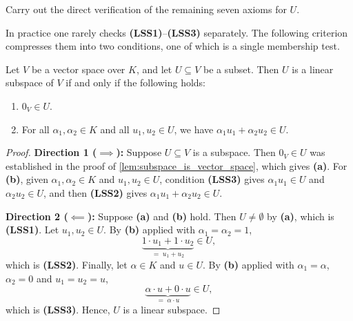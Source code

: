 \begin{exercise}
\label{exc:subspace_axioms}
Carry out the direct verification of the remaining seven axioms for $U$.
\end{exercise}

In practice one rarely checks \textbf{(LSS1)}--\textbf{(LSS3)} separately. The following criterion compresses them into two conditions, one of which is a single membership test.

\begin{lemma}
\label{lem:subspace_criterion}
Let $V$ be a vector space over $K$, and let $U \subseteq V$ be a subset. Then $U$ is a linear subspace of $V$ if and only if the following holds:
\begin{enumerate}[label=\textbf{(\alph*)}]
    \item $0_V \in U$.
    \item For all $\alpha_1, \alpha_2 \in K$ and all $u_1, u_2 \in U$, we have $\alpha_1 u_1 + \alpha_2 u_2 \in U$.
\end{enumerate}
\end{lemma}

\begin{proof}
\textbf{Direction 1 ($\implies$):} Suppose $U \subseteq V$ is a subspace. Then $0_V \in U$ was established in the proof of \cref{lem:subspace_is_vector_space}, which gives \textbf{(a)}. For \textbf{(b)}, given $\alpha_1, \alpha_2 \in K$ and $u_1, u_2 \in U$, condition \textbf{(LSS3)} gives $\alpha_1 u_1 \in U$ and $\alpha_2 u_2 \in U$, and then \textbf{(LSS2)} gives $\alpha_1 u_1 + \alpha_2 u_2 \in U$.

\textbf{Direction 2 ($\impliedby$):} Suppose \textbf{(a)} and \textbf{(b)} hold. Then $U \ne \emptyset$ by \textbf{(a)}, which is \textbf{(LSS1)}. Let $u_1, u_2 \in U$. By \textbf{(b)} applied with $\alpha_1 = \alpha_2 = 1$,
\[
\underbrace{1 \cdot u_1 + 1 \cdot u_2}_{= \; u_1 + u_2} \in U,
\]
which is \textbf{(LSS2)}. Finally, let $\alpha \in K$ and $u \in U$. By \textbf{(b)} applied with $\alpha_1 = \alpha$, $\alpha_2 = 0$ and $u_1 = u_2 = u$,
\[
\underbrace{\alpha \cdot u + 0 \cdot u}_{= \; \alpha \cdot u} \in U,
\]
which is \textbf{(LSS3)}. Hence, $U$ is a linear subspace.
\end{proof}

